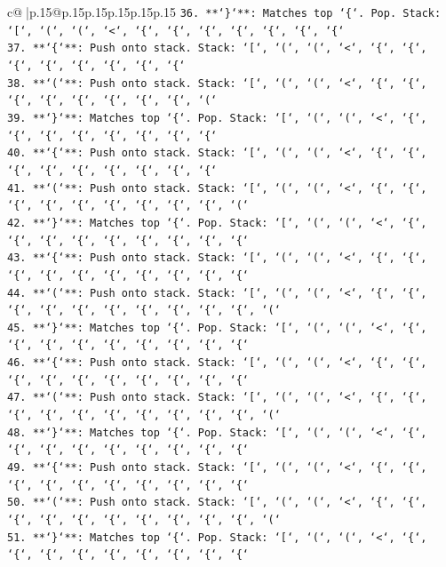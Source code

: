 \documentclass{article}
\begin{document}
{\begin{supertabular}{c@{$\;$}|p{.15\linewidth}@{}p{.15\linewidth}p{.15\linewidth}p{.15\linewidth}p{.15\linewidth}p{.15\linewidth}}
{{{\texttt{36. **`\}`**: Matches top `\{`. Pop. Stack: `{[}`, `(`, `(`, `<`, `\{`, `\{`, `\{`, `\{`, `\{`, `\{`, `\{`} \\
\texttt{37. **`\{`**: Push onto stack. Stack: `{[}`, `(`, `(`, `<`, `\{`, `\{`, `\{`, `\{`, `\{`, `\{`, `\{`, `\{`} \\
\texttt{38. **`(`**: Push onto stack. Stack: `{[}`, `(`, `(`, `<`, `\{`, `\{`, `\{`, `\{`, `\{`, `\{`, `\{`, `\{`, `(`} \\
\texttt{39. **`\}`**: Matches top `\{`. Pop. Stack: `{[}`, `(`, `(`, `<`, `\{`, `\{`, `\{`, `\{`, `\{`, `\{`, `\{`, `\{`} \\
\texttt{40. **`\{`**: Push onto stack. Stack: `{[}`, `(`, `(`, `<`, `\{`, `\{`, `\{`, `\{`, `\{`, `\{`, `\{`, `\{`, `\{`} \\
\texttt{41. **`(`**: Push onto stack. Stack: `{[}`, `(`, `(`, `<`, `\{`, `\{`, `\{`, `\{`, `\{`, `\{`, `\{`, `\{`, `\{`, `(`} \\
\texttt{42. **`\}`**: Matches top `\{`. Pop. Stack: `{[}`, `(`, `(`, `<`, `\{`, `\{`, `\{`, `\{`, `\{`, `\{`, `\{`, `\{`, `\{`} \\
\texttt{43. **`\{`**: Push onto stack. Stack: `{[}`, `(`, `(`, `<`, `\{`, `\{`, `\{`, `\{`, `\{`, `\{`, `\{`, `\{`, `\{`, `\{`} \\
\texttt{44. **`(`**: Push onto stack. Stack: `{[}`, `(`, `(`, `<`, `\{`, `\{`, `\{`, `\{`, `\{`, `\{`, `\{`, `\{`, `\{`, `\{`, `(`} \\
\texttt{45. **`\}`**: Matches top `\{`. Pop. Stack: `{[}`, `(`, `(`, `<`, `\{`, `\{`, `\{`, `\{`, `\{`, `\{`, `\{`, `\{`, `\{`} \\
\texttt{46. **`\{`**: Push onto stack. Stack: `{[}`, `(`, `(`, `<`, `\{`, `\{`, `\{`, `\{`, `\{`, `\{`, `\{`, `\{`, `\{`, `\{`} \\
\texttt{47. **`(`**: Push onto stack. Stack: `{[}`, `(`, `(`, `<`, `\{`, `\{`, `\{`, `\{`, `\{`, `\{`, `\{`, `\{`, `\{`, `\{`, `(`} \\
\texttt{48. **`\}`**: Matches top `\{`. Pop. Stack: `{[}`, `(`, `(`, `<`, `\{`, `\{`, `\{`, `\{`, `\{`, `\{`, `\{`, `\{`, `\{`} \\
\texttt{49. **`\{`**: Push onto stack. Stack: `{[}`, `(`, `(`, `<`, `\{`, `\{`, `\{`, `\{`, `\{`, `\{`, `\{`, `\{`, `\{`, `\{`} \\
\texttt{50. **`(`**: Push onto stack. Stack: `{[}`, `(`, `(`, `<`, `\{`, `\{`, `\{`, `\{`, `\{`, `\{`, `\{`, `\{`, `\{`, `\{`, `(`} \\
\texttt{51. **`\}`**: Matches top `\{`. Pop. Stack: `{[}`, `(`, `(`, `<`, `\{`, `\{`, `\{`, `\{`, `\{`, `\{`, `\{`, `\{`, `\{`} \\
}}}
\end{supertabular}}
\end{document}
